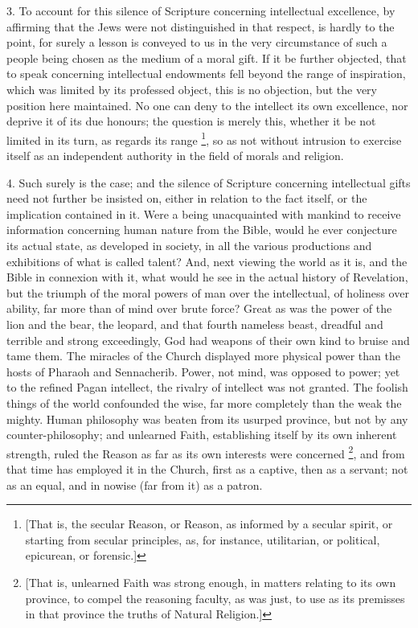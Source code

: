 3. To account for this silence of Scripture concerning intellectual
excellence, by affirming that the Jews were not distinguished in that
respect, is hardly to the point, for surely a lesson is conveyed to us
in the very circumstance of such a people being chosen as the medium
of a moral gift. If it be further objected, that to speak concerning
intellectual endowments fell beyond the range of inspiration, which
was limited by its professed object, this is no objection, but the
very position here maintained. No one can deny to the intellect its
own excellence, nor deprive it of its due honours; the question is
merely this, whether it be not limited in its turn, as regards its
range \footnote{[That is, the
secular Reason, or Reason, as informed by a secular spirit, or
starting from secular principles, as, for instance, utilitarian, or
political, epicurean, or forensic.]}, so as not without
intrusion to exercise itself as an independent authority in the field
of morals and religion.

4. Such surely is the case; and the silence of Scripture concerning
intellectual gifts need not further be insisted on, either in relation
to the fact itself, or the implication contained in it. Were a being
unacquainted with mankind to receive information concerning human
nature from the Bible, would he ever conjecture its actual state, as
developed in society, in all the various productions and exhibitions
of what is called talent? And, next viewing the world as it is, and
the Bible in connexion with it, what would he see in the actual
history of Revelation, but the triumph of the moral powers of man over
the intellectual, of holiness over ability, far more than of mind over
brute force? Great as was the power of the lion and the bear, the
leopard, and that fourth nameless beast, dreadful and terrible and
strong exceedingly, God had weapons of their own kind to bruise and
tame them. The miracles of the Church displayed more physical power
than the hosts of Pharaoh and Sennacherib. Power, not mind, was
opposed to power; yet to the refined Pagan intellect, the rivalry of
intellect was not granted. The foolish things of the world confounded
the wise, far more completely than the weak the mighty. Human
philosophy was beaten from its usurped province, but not by any
counter-philosophy; and unlearned Faith, establishing itself by its
own inherent strength, ruled the Reason as far as its own interests
were concerned \footnote{[That is,
unlearned Faith was strong enough, in matters relating to its own
province, to compel the reasoning faculty, as was just, to use as its
premisses in that province the truths of Natural Religion.]}, and from
that time has employed it in the Church, first as a captive, then as a
servant; not as an equal, and in nowise (far from it) as a patron.

